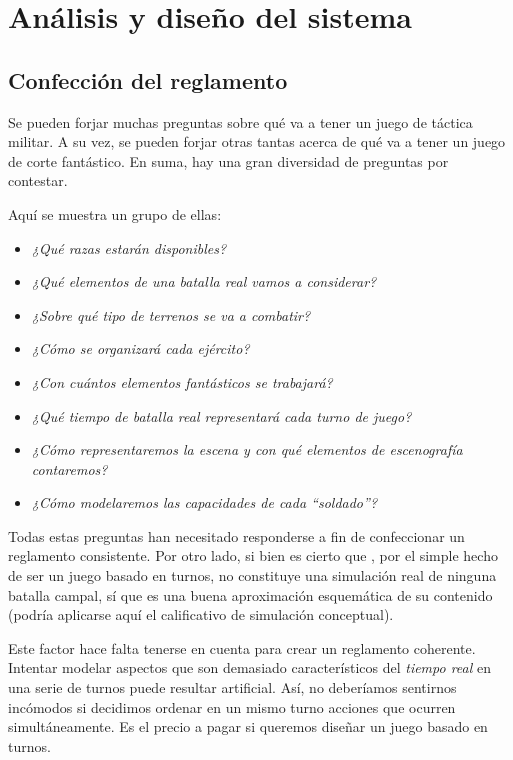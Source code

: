 %


\section{Análisis y diseño del sistema}
\label{sec:diseno}

\subsection{Confección del reglamento}
Se pueden forjar muchas preguntas sobre qué va a tener un juego de
táctica militar. A su vez, se pueden forjar otras tantas acerca de qué
va a tener un juego de corte fantástico. En suma, hay una gran
diversidad de preguntas por contestar.

Aquí se muestra un grupo de ellas:
\begin{itemize}
\item \emph{¿Qué razas estarán disponibles?}
\item \emph{¿Qué elementos de una batalla real vamos a considerar?}
\item \emph{¿Sobre qué tipo de terrenos se va a combatir?}
\item \emph{¿Cómo se organizará cada ejército?}
\item \emph{¿Con cuántos elementos fantásticos se trabajará?}
\item \emph{¿Qué tiempo de batalla real representará cada turno de
    juego?}
\item \emph{¿Cómo representaremos la escena y con qué elementos de
    escenografía contaremos?}
\item \emph{¿Cómo modelaremos las capacidades de cada ``soldado''?}
\end{itemize}

Todas estas preguntas han necesitado responderse a fin de confeccionar
un reglamento consistente. Por otro lado, si bien es cierto que
\gomf, por el simple hecho de ser un juego basado en turnos, no
constituye una simulación real de ninguna batalla campal, sí que es una
buena aproximación esquemática de su contenido (podría aplicarse aquí el
calificativo de simulación conceptual).

Este factor hace falta tenerse en cuenta para crear un reglamento
coherente. Intentar modelar aspectos que son demasiado característicos
del \emph{tiempo real} en una serie de turnos puede resultar
artificial. Así, no deberíamos sentirnos incómodos si decidimos
ordenar en un mismo turno acciones que ocurren
simultáneamente. Es el precio a pagar si queremos diseñar un juego
basado en turnos.

